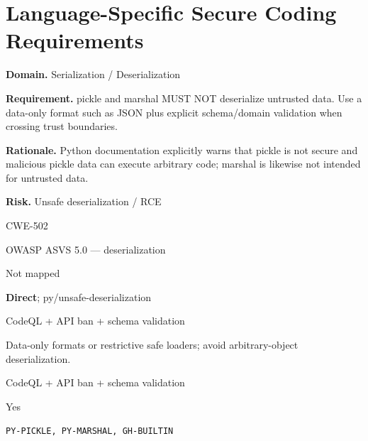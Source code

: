 \documentclass[10pt,letterpaper]{article}
\newcommand{\prioritybadge}[2]{\tcbox[on line,boxrule=0pt,arc=1.2mm,boxsep=0.7mm,left=1mm,right=1mm,top=0.4mm,bottom=0.4mm,colback=#2!12,coltext=#2]{\scriptsize\bfseries #1}}
\begin{document}
\section{Language-Specific Secure Coding Requirements}
\begin{rulebox}[title={\texttt{SCS-PY-DESER-001} \hfill \prioritybadge{Critical Control}{Critical}}]
\textbf{Domain.} Serialization / Deserialization

\textbf{Requirement.} pickle and marshal MUST NOT deserialize untrusted data. Use a data-only format such as JSON plus explicit schema/domain validation when crossing trust boundaries.

\textbf{Rationale.} Python documentation explicitly warns that pickle is not secure and malicious pickle data can execute arbitrary code; marshal is likewise not intended for untrusted data.

\textbf{Risk.} Unsafe deserialization / RCE

\begin{description}[leftmargin=2.65cm,labelwidth=2.3cm,style=nextline,itemsep=1pt,topsep=3pt]
  \item[CWE] CWE-502
  \item[OWASP] OWASP ASVS 5.0 --- deserialization
  \item[CERT] Not mapped
  \item[CodeQL] \textbf{Direct}; py/unsafe-deserialization
  \item[Enforcement] CodeQL + API ban + schema validation
  \item[Prevention] Data-only formats or restrictive safe loaders; avoid arbitrary-object deserialization.
  \item[Verification] CodeQL + API ban + schema validation
  \item[Automation] Yes
  \item[Sources] \texttt{PY-PICKLE, PY-MARSHAL, GH-BUILTIN}
\end{description}
\end{rulebox}
\end{document}
